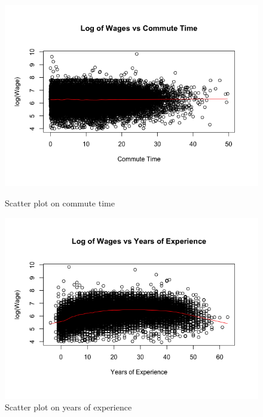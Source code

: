 \documentclass{article}
\begin{document}
      

      \begin{figure}
        \centering
        \begin{minipage}{.45\textwidth}
          \centering
          \includegraphics[scale=0.35]{scattercom}
          \caption{Scatter plot on commute time}
          \label{fig:scattercom}

          \includegraphics[scale=0.35]{scatterexp}
          \caption{Scatter plot on years of experience}
          \label{fig:scatterexp}


\end{minipage}
\end{figure}
\end{document}
